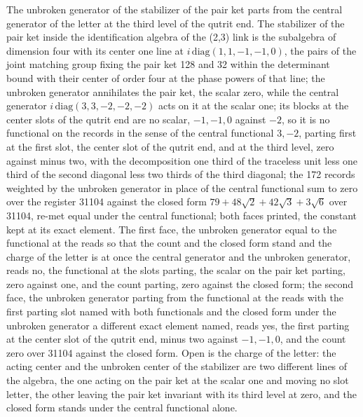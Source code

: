 \begin{chwall}\label{box:V-1-D541778-w-stab:1}
The unbroken generator of the stabilizer of the pair ket parts from the central generator of the letter at the third level of the qutrit end. The stabilizer of the pair ket inside the identification algebra of the (2,3) link is the subalgebra of dimension four with its center one line at $i\,\mathrm{diag}(1,1,-1,-1,0)$, the pairs of the joint matching group fixing the pair ket 128 and 32 within the determinant bound with their center of order four at the phase powers of that line; the unbroken generator annihilates the pair ket, the scalar zero, while the central generator $i\,\mathrm{diag}(3,3,-2,-2,-2)$ acts on it at the scalar one; its blocks at the center slots of the qutrit end are no scalar, $-1,-1,0$ against $-2$, so it is no functional on the records in the sense of the central functional $3,-2$, parting first at the first slot, the center slot of the qutrit end, and at the third level, zero against minus two, with the decomposition one third of the traceless unit less one third of the second diagonal less two thirds of the third diagonal; the 172 records weighted by the unbroken generator in place of the central functional sum to zero over the register 31104 against the closed form $79 + 48\sqrt{2} + 42\sqrt{3} + 3\sqrt{6}$ over 31104, re-met equal under the central functional; both faces printed, the constant kept at its exact element.
The first face, the unbroken generator equal to the functional at the reads so that the count and the closed form stand and the charge of the letter is at once the central generator and the unbroken generator, reads no, the functional at the slots parting, the scalar on the pair ket parting, zero against one, and the count parting, zero against the closed form; the second face, the unbroken generator parting from the functional at the reads with the first parting slot named with both functionals and the closed form under the unbroken generator a different exact element named, reads yes, the first parting at the center slot of the qutrit end, minus two against $-1,-1,0$, and the count zero over 31104 against the closed form. Open is the charge of the letter: the acting center and the unbroken center of the stabilizer are two different lines of the algebra, the one acting on the pair ket at the scalar one and moving no slot letter, the other leaving the pair ket invariant with its third level at zero, and the closed form stands under the central functional alone.
\end{chwall}
